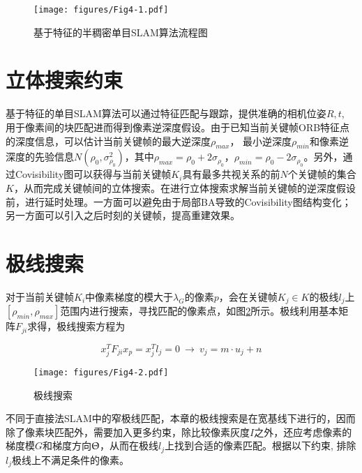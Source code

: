 \begin{figure}[h]
\centering
\texttt{[image: figures/Fig4-1.pdf]}
\caption{基于特征的半稠密单目SLAM算法流程图}
\label{fig4.1}
\end{figure}





\section{立体搜索约束}
基于特征的单目SLAM算法可以通过特征匹配与跟踪，提供准确的相机位姿$R,t$, 用于像素间的块匹配进而得到像素逆深度假设。由于已知当前关键帧ORB特征点的深度信息，可以估计当前关键帧的最大逆深度$\rho_{max}$， 最小逆深度$\rho_{min}$和像素逆深度的先验信息$N\left( \rho_0,\sigma_{\rho_0}^2  \right)$，其中$\rho_{max}=\rho_0+2\sigma_{\rho_0}$，$\rho_{min}=\rho_0-2\sigma_{\rho_0}$。另外，通过Covisibility图可以获得与当前关键帧$K_i$具有最多共视关系的前$N$个关键帧的集合$K$，从而完成关键帧间的立体搜索。在进行立体搜索求解当前关键帧的逆深度假设前，进行延时处理。一方面可以避免由于局部BA导致的Covisibility图结构变化；另一方面可以引入之后时刻的关键帧，提高重建效果。


\section{极线搜索}
对于当前关键帧$K_i$中像素梯度的模大于$\lambda_G$的像素$p$，会在关键帧$K_j \in K$的极线$l_j$上$\left[ \rho_{min}, \rho_{max} \right]$范围内进行搜索，寻找匹配的像素点，如图\ref{fig4.2}所示。极线利用基本矩阵$F_{ji}$求得，极线搜索方程为

\begin{equation}
\label{equ4.1}
x_j^T F_{ji}x_p = x^T_jl_j=0 \  \rightarrow \  v_j = m \cdot u_j+n
\end{equation}

\begin{figure}
\centering
\texttt{[image: figures/Fig4-2.pdf]}
\caption{极线搜索}
\label{fig4.2}
\end{figure}

不同于直接法SLAM中的窄极线匹配，本章的极线搜索是在宽基线下进行的，因而除了像素块匹配外，需要加入更多约束，除比较像素灰度$I$之外，还应考虑像素的梯度模$G$和梯度方向$\Uptheta$，从而在极线$l_j$上找到合适的像素匹配。根据以下约束\upcite{[4.2]}, 排除$l_j$极线上不满足条件的像素。


